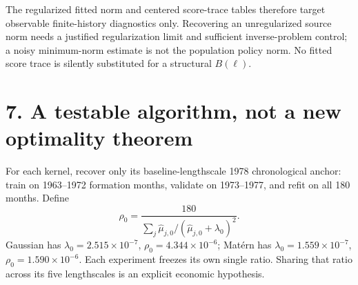 \documentclass[11pt,letterpaper]{article}
\begin{document}
The regularized fitted norm and centered score-trace tables therefore target
observable finite-history diagnostics only. Recovering an unregularized source
norm needs a justified regularization limit and sufficient inverse-problem
control; a noisy minimum-norm estimate is not the population policy norm.
No fitted score trace is silently substituted for a structural $B(\ell)$.

\newpage
\section*{7. A testable algorithm, not a new optimality theorem}
For each kernel, recover only its baseline-lengthscale 1978 chronological
anchor: train on 1963--1972 formation months, validate on 1973--1977, and refit
on all 180 months. Define
\[
 \rho_0=\frac{180}{\sum_j\widehat\mu_{j,0}/(\widehat\mu_{j,0}+\lambda_0)^2}.
\]
Gaussian has $\lambda_0=2.515\times10^{-7}$, $\rho_0=4.344\times10^{-6}$;
Mat\'ern has $\lambda_0=1.559\times10^{-7}$, $\rho_0=1.590\times10^{-6}$.
Each experiment freezes its own single ratio. Sharing that ratio across its
five lengthscales is an explicit economic hypothesis.
\end{document}
